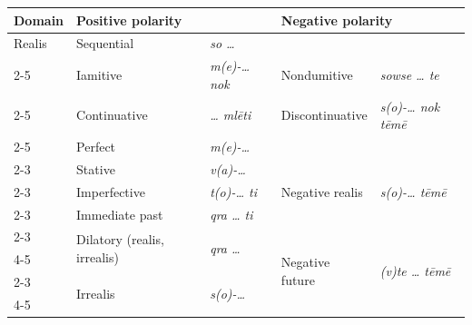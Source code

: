 \documentclass[output=paper,colorlinks,citecolor=brown,draft]{langscibook}
\begin{document}

\begin{table}\scriptsize 
\begin{tabularx}{\textwidth}{|l|lX|ll|}
\hline
Domain & \multicolumn{2}{l|}{Positive polarity}                & \multicolumn{2}{l|}{Negative polarity}\\
\hline
{Realis} & Sequential & \textit{so …}         &                                   & \\
\cline{2-5}
             & Iamitive                     & \textit{m(e)-… nok}   & Nondumitive                       & \textit{sowse … te}\\
\cline{2-5}
            & Continuative                 & \textit{… mlēti}      & Discontinuative                   & \textit{s(o)-… nok tēmē}\\
\cline{2-5}
             & Perfect                      & \textit{m(e)-…}       & %
                                                                         & %
                                                                         \\
\cline{2-3}
             & Stative                      & \textit{v(a)-…}       &  & \\
\cline{2-3}
             & Imperfective                 & \textit{t(o)-… ti}    & {Negative realis}  & {\textit{s(o)-… tēmē}}\\
\cline{2-3}
             & Immediate past               & \textit{qra … ti}     &  & \\
\cline{2-3}
             & \multirow{2}{*}{Dilatory (realis, irrealis)}  & \multirow{2}{*}{\textit{qra …}}        &  & \\
\cline{4-5} %
\cline{1-1}
&          &                       & \multirow{2}{*}{Negative future}  & \multirow{2}{*}{\textit{(v)te … tēmē}}\\
\cline{2-3}
             & \multirow{2}{*}{Irrealis}    & \multirow{2}{*}{\textit{s(o)-…}}  &                       & \\
\cline{4-5}
             &                              &                       & %

\end{tabularx}
\end{table}
\end{document}
